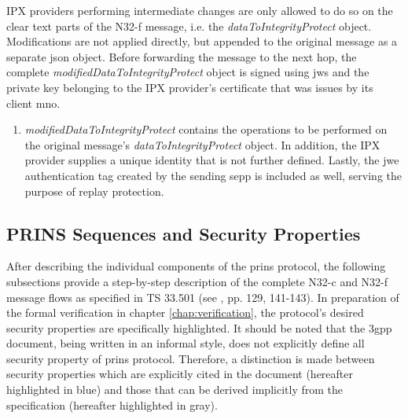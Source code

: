 IPX providers performing intermediate changes are only allowed to do so on the clear text parts of the N32-f message, i.e. the \textit{dataToIntegrityProtect} object.
Modifications are not applied directly, but appended to the original message as a separate \gls{json} object.
Before forwarding the message to the next hop, the complete \textit{modifiedDataToIntegrityProtect} object is signed using \gls{jws} and the private key belonging to the IPX provider's certificate that was issues by its client \gls{mno}.

\begin{enumerate}[label=--]
    \item \textit{modifiedDataToIntegrityProtect} contains the operations to be performed on the original message's \textit{dataToIntegrityProtect} object. In addition, the IPX provider supplies a unique identity that is not further defined. Lastly, the \gls{jwe} authentication tag created by the sending \gls{sepp} is included as well, serving the purpose of replay protection.
\end{enumerate}


\subsection{PRINS Sequences and Security Properties}
\label{ssec:prins-sequence}

After describing the individual components of the \gls{prins} protocol, the following subsections provide a step-by-step description of the complete N32-c and N32-f message flows as specified in TS 33.501 (see \cite{3gpp.33.501}, pp. 129, 141-143).
In preparation of the formal verification in chapter \ref{chap:verification}, the protocol's desired security properties are specifically highlighted.
It should be noted that the \gls{3gpp} document, being written in an informal style, does not explicitly define all security property of \gls{prins} protocol.
Therefore, a distinction is made between security properties which are explicitly cited in the document (hereafter highlighted in blue) and those that can be derived implicitly from the specification (hereafter highlighted in gray).

\begin{minipage}{0.5\textwidth}
\end{minipage}
\begin{minipage}{0.4\textwidth}
\end{minipage}

